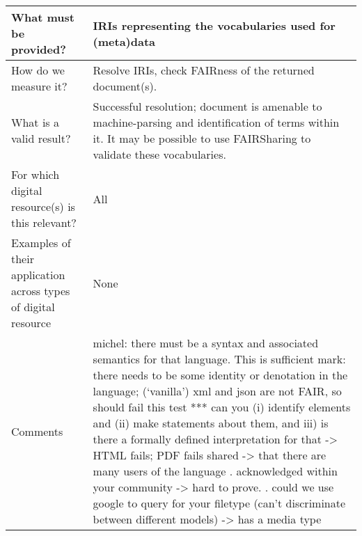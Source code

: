 \documentclass[english]{article}
\begin{document}
\begin{longtable}{|p{5cm}|p{9cm}|}
\\



\hline
What must be provided? &  


IRIs representing the vocabularies used for (meta)data 


\\



\hline
How do we measure it? &  


Resolve IRIs, check FAIRness of the returned document(s).


\\



\hline
What is a valid result? &  



Successful resolution; document is amenable to machine-parsing and identification of terms within it.  It may be possible to use FAIRSharing to validate these vocabularies.



\\



\hline
For which digital resource(s) is this relevant? &  All\\



\hline
Examples of their application across types of digital resource &  None

\\



\hline

Comments & 

michel: there must be a syntax and associated semantics for that language.  This is sufficient \newline 
mark: there needs to be some identity or denotation in the language; (‘vanilla’) xml and json are not FAIR, so should fail this test\newline 
\newline 
*** can you (i) identify elements and (ii) make statements about them, and iii) is there a formally defined interpretation for that 
 -> HTML fails; PDF fails
\newline 
shared\newline 
-> that there are many users of the language\newline 
. acknowledged within your community\newline 
 -> hard to prove.\newline 
. could we use google to query for your filetype (can’t discriminate between different models)\newline 
-> has a media type\newline 


\end{longtable}
\end{document}
